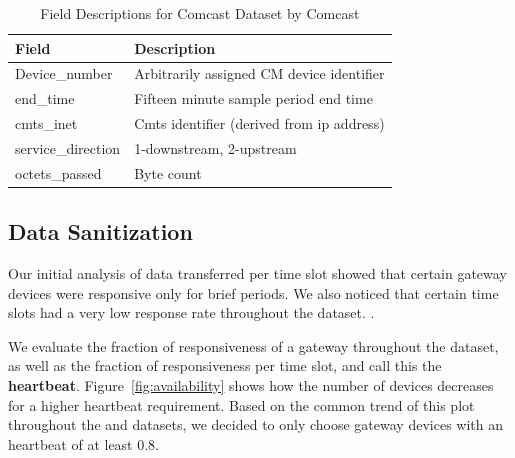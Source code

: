 \begin{table}[ht!]
\small
\begin{tabular}{|l|l|}
\hline
\textbf{Field}         & \textbf{Description}                      \\ \hline
Device\_number         & Arbitrarily assigned CM device identifier \\ \hline
end\_time              & Fifteen minute sample period end time     \\ \hline
cmts\_inet             & Cmts identifier (derived from ip address) \\ \hline
service\_direction     & 1-downstream, 2-upstream                  \\ \hline
octets\_passed         & Byte count                                \\ \hline
\end{tabular}
\caption{Field Descriptions for Comcast Dataset by Comcast}
\label{tab:field-description}
\end{table}

\subsection{Data Sanitization}
\label{subsec:data-sanitization}

Our initial analysis of data transferred per time slot showed that certain 
gateway devices were responsive only for brief periods. We also noticed that 
certain time slots had a very low response rate throughout the dataset. 
.

We evaluate the fraction of responsiveness of a gateway throughout the dataset, 
as well as the fraction of responsiveness per time slot, and call this the 
\textbf{heartbeat}. Figure~\ref{fig:availability} shows how the number of 
devices decreases for a higher heartbeat requirement. Based on the common 
trend of this plot throughout the \test and \control datasets, we decided to 
only choose gateway devices with an heartbeat of at least 0.8. 


